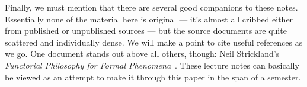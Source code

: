 Finally, we must mention that there are several good companions to these notes.  Essentially none of the material here is original --- it's almost all cribbed either from published or unpublished sources --- but the source documents are quite scattered and individually dense.  We will make a point to cite useful references as we go.  One document stands out above all others, though: Neil Strickland's \textit{Functorial Philosophy for Formal Phenomena}~\cite{StricklandFPFP}.  These lecture notes can basically be viewed as an attempt to make it through this paper in the span of a semester.

